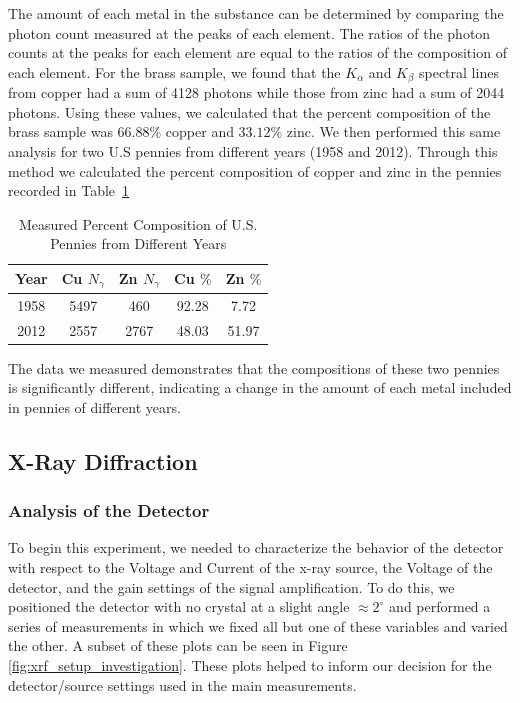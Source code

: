\documentclass[%
 reprint,
 amsmath,amssymb,
 aps,
 pra,
]{revtex4-1}
\begin{document}
The amount of each metal in the substance can be determined by comparing the photon count measured at the peaks of each element. The ratios of the photon counts at the peaks for each element are equal to the ratios of the composition of each element. For the brass sample, we found that the $K_{\alpha}$ and $K_{\beta}$ spectral lines from copper had a sum of 4128 photons while those from zinc had a sum of 2044 photons. Using these values, we calculated that the percent composition of the brass sample was $66.88 \%$ copper and $33.12 \%$ zinc. We then performed this same analysis for two U.S pennies from different years (1958 and 2012). Through this method we calculated the percent composition of copper and zinc in the pennies recorded in Table~\ref{Tab:Pennies}

\begin{table}[htbp]
	\begin{center}
		\begin{tabular}{|c|c|c|c|c|}
			\hline Year & Cu $N_{\gamma}$ & Zn $N_{\gamma}$ & Cu $\%$ & Zn $\%$ \\
			\hline 1958 & 5497 & 460 & 92.28 & 7.72 \\
			\hline 2012 & 2557 & 2767 & 48.03 & 51.97 \\
			\hline
		\end{tabular}
	\end{center}
	\caption{Measured Percent Composition of U.S. Pennies from Different Years}
	\label{Tab:Pennies}
\end{table}

The data we measured demonstrates that the compositions of these two pennies is significantly different, indicating a change in the amount of each metal included in pennies of different years.

\subsection{X-Ray Diffraction}

\subsubsection{Analysis of the Detector}

To begin this experiment, we needed to characterize the behavior of the detector with respect to the Voltage and Current of the x-ray source, the Voltage of the detector, and the gain settings of the signal amplification. To do this, we positioned the detector with no crystal at a slight angle $\approx 2^\circ$ and performed a series of measurements in which we fixed all but one of these variables and varied the other. A subset of these plots can be seen in Figure \ref{fig:xrf_setup_investigation}. These plots helped to inform our decision for the detector/source settings used in the main measurements.
\end{document}
